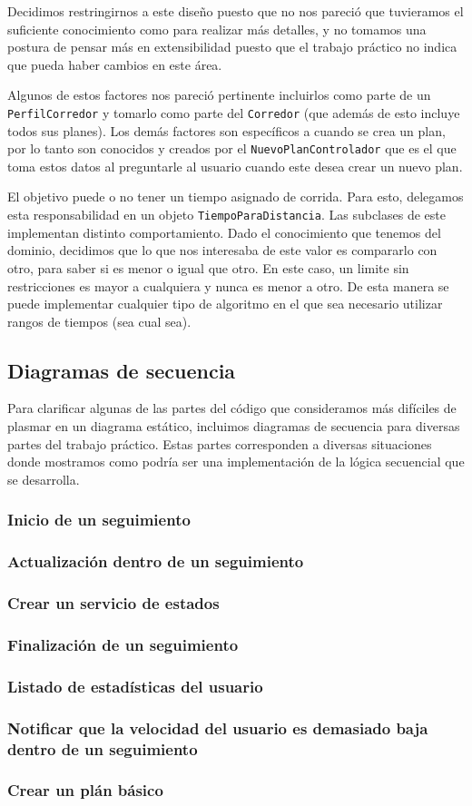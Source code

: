 \documentclass[10pt, a4paper,english,spanish]{article}
\begin{document}
Decidimos restringirnos a este diseño puesto que no nos pareció que tuvieramos el suficiente conocimiento como para realizar más detalles, y no tomamos una postura de pensar más en extensibilidad puesto que el trabajo práctico no indica que pueda haber cambios en este área.

Algunos de estos factores nos pareció pertinente incluirlos como parte de un \texttt{PerfilCorredor} y tomarlo como parte del \texttt{Corredor} (que además de esto incluye todos sus planes). Los demás factores son específicos a cuando se crea un plan, por lo tanto son conocidos y creados por el \texttt{NuevoPlanControlador} que es el que toma estos datos al preguntarle al usuario cuando este desea crear un nuevo plan.

El objetivo puede o no tener un tiempo asignado de corrida. Para esto, delegamos esta responsabilidad en un objeto \texttt{TiempoParaDistancia}. Las subclases de
este implementan distinto comportamiento. Dado el conocimiento que tenemos del dominio, decidimos que lo que nos interesaba de este valor es compararlo con otro, para saber si es menor o igual que otro. En este caso, un limite sin restricciones es mayor a cualquiera y nunca es menor a otro. De esta manera se puede implementar cualquier tipo de algoritmo en el que sea necesario utilizar rangos de tiempos (sea cual sea).

\subsection{Diagramas de secuencia}

Para clarificar algunas de las partes del código que consideramos más difíciles de plasmar en un diagrama estático, incluimos diagramas de secuencia para diversas partes del trabajo práctico. Estas partes corresponden a diversas situaciones donde mostramos como podría ser una implementación de la lógica secuencial que se desarrolla.

\subsubsection{Inicio de un seguimiento}
\subsubsection{Actualización dentro de un seguimiento}
\subsubsection{Crear un servicio de estados}
\subsubsection{Finalización de un seguimiento}
\subsubsection{Listado de estadísticas del usuario}
\subsubsection{Notificar que la velocidad del usuario es demasiado baja dentro de un seguimiento}
\subsubsection{Crear un plán básico}
\end{document}
